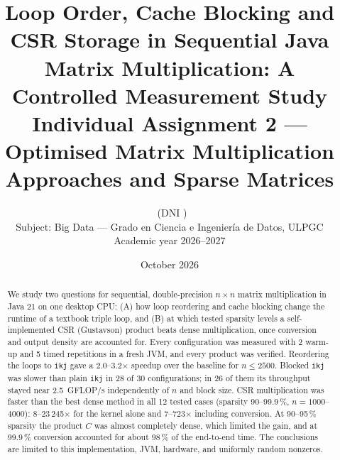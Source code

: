 \documentclass[11pt,a4paper]{article}
\title{\textbf{Loop Order, Cache Blocking and CSR Storage in Sequential Java\\ Matrix Multiplication: A Controlled Measurement Study}\\[4pt]
\large Individual Assignment 2 --- Optimised Matrix Multiplication Approaches and Sparse Matrices}
\author{\authorname\ (DNI \authordni)\\ Subject: Big Data --- Grado en Ciencia e Ingenier\'ia de Datos, ULPGC \\ Academic year 2026--2027}
\date{October 2026}
\begin{document}
\maketitle

\begin{abstract}
We study two questions for sequential, double-precision $n\times n$ matrix multiplication in Java 21 on one desktop CPU: (A) how loop reordering and cache blocking change the runtime of a textbook triple loop, and (B) at which tested sparsity levels a self-implemented CSR (Gustavson) product beats dense multiplication, once conversion and output density are accounted for. Every configuration was measured with 2 warm-up and 5 timed repetitions in a fresh JVM, and every product was verified. Reordering the loops to \texttt{ikj} gave a 2.0--3.2$\times$ speedup over the baseline for $n\le 2500$. Blocked \texttt{ikj} was slower than plain \texttt{ikj} in 28 of 30 configurations; in 26 of them its throughput stayed near 2.5~GFLOP/s independently of $n$ and block size. CSR multiplication was faster than the best dense method in all 12 tested cases (sparsity 90--99.9\,\%, $n=1000$--$4000$): 8--23\,245$\times$ for the kernel alone and 7--723$\times$ including conversion. At 90--95\,\% sparsity the product $C$ was almost completely dense, which limited the gain, and at 99.9\,\% conversion accounted for about 98\,\% of the end-to-end time. The conclusions are limited to this implementation, JVM, hardware, and uniformly random nonzeros.
\end{abstract}
\end{document}
